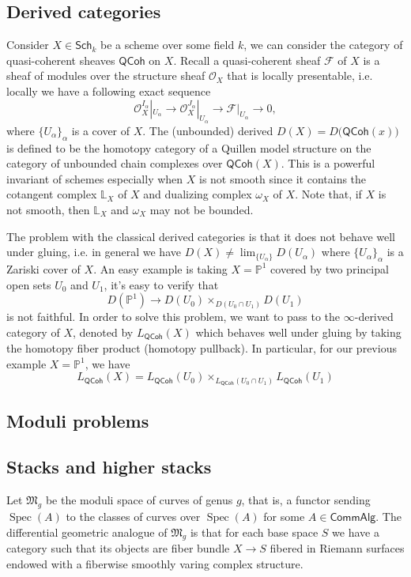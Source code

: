 \documentclass[11pt]{amsart}
\numberwithin{equation}{section}
\theoremstyle{definition}
\theoremstyle{remark}
\numberwithin{equation}{section}
\newcommand{\CP}{{\mathbb P}}
\newcommand{\CO}{{\mathcal O}}
\newcommand{\Lx}{{\mathbb{L}}}
\newcommand{\M}{{\mathfrak{M}}}
\newcommand{\sch}{\mathsf{Sch}}
\newcommand{\calg}{\mathsf{CommAlg}}
\newcommand{\qcoh}{\mathsf{QCoh}}
\newcommand{\spec}{\operatorname{Spec}}
\begin{document}
\subsection{Derived categories}
Consider $X\in \sch_k$ be a scheme over some field $k$, we can consider the category of quasi-coherent sheaves $\qcoh$ on $X$. Recall a quasi-coherent sheaf   $\mathcal{F}$ of $X$ is a sheaf of modules over the structure sheaf $\CO_X$ that is locally presentable, i.e. locally we have a following exact sequence
\begin{equation*}
\CO_X^{I_\alpha}|_{U_\alpha} \to \CO_X^{J_\alpha}|_{U_\alpha} \to \mathcal{F}|_{U_\alpha}\to 0,
\end{equation*}
where $\{{U_\alpha}\}_{\alpha}$ is a cover of $X$. The (unbounded) derived $D(X)=D\big(\qcoh(x)\big)$ is defined to be the homotopy category of a Quillen model structure on the category of unbounded chain complexes over $\qcoh(X)$. This is a powerful invariant of schemes especially when $X$ is not smooth since it contains the cotangent complex $\Lx_X$ of $X$ and dualizing complex $\omega_X$ of $X$. Note that, if $X$ is not smooth, then $\Lx_X$ and $\omega_X$ may not be bounded.

The problem with the classical derived categories is that it does not behave well under gluing, i.e. in general we have $D(X) \not= \lim_{\{U_{\alpha}\}} D(U_{\alpha})$ where $\{U_{\alpha} \}_{\alpha}$ is a Zariski cover of $X$. An easy example is taking $X=\CP^1$ covered by two principal open sets $U_0$ and $U_1$, it's easy to verify that
\begin{equation*}
D(\CP^1) \to D(U_0) \times_{D(U_0\cap U_1)} D(U_1)
\end{equation*} 
is not faithful. In order to solve this problem, we want to pass to the $\infty$-derived category of $X$, denoted by $L_{\qcoh}(X)$ which behaves well under gluing by taking the homotopy fiber product (homotopy pullback). In particular, for our previous example $X=\CP^1$, we have
\begin{equation*}
L_{\qcoh}(X) = L_{\qcoh}(U_0)\times_{L_{\qcoh}(U_0 \cap U_1)} L_{\qcoh}(U_1)
\end{equation*} 

\subsection{Moduli problems}
\subsection{Stacks and higher stacks}
Let $\M_g$ be the moduli space of curves of genus $g$, that is, a functor sending $\spec(A)$ to the classes of  curves over $\spec(A)$ for some $A\in \calg$. The differential geometric analogue of $\M_g$ is that for each base space $S$ we have a category such that its objects are fiber bundle $X\to S$ fibered in Riemann surfaces endowed with a fiberwise smoothly varing complex structure. 
\end{document}

